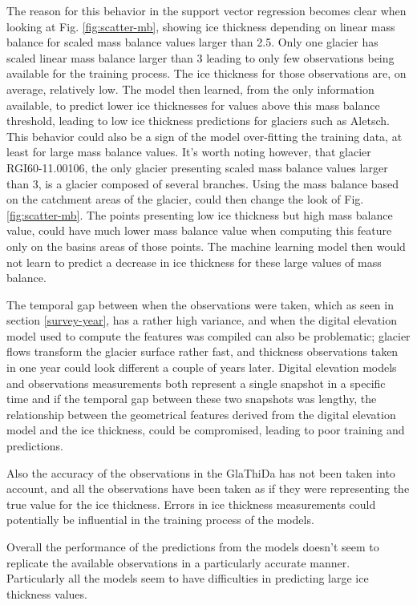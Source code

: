The reason for this behavior in the support vector regression becomes clear when looking at Fig. \ref{fig:scatter-mb}, showing ice thickness depending on linear mass balance for scaled mass balance values larger than 2.5. Only one glacier has scaled linear mass balance larger than 3 leading to only few observations being available for the training process. The ice thickness for those observations are, on average, relatively low. The model then learned, from the only information available, to predict lower ice thicknesses for values above this mass balance threshold, leading to low ice thickness predictions for glaciers such as Aletsch. This behavior could also be a sign of the model over-fitting the training data, at least for large mass balance values. It's worth noting however, that glacier RGI60-11.00106, the only glacier presenting scaled mass balance values larger than 3, is a glacier composed of several branches. Using the mass balance based on the catchment areas of the glacier, could then change the look of Fig. \ref{fig:scatter-mb}. The points presenting low ice thickness but high mass balance value, could have much lower mass balance value when computing this feature only on the basins areas of those points. The machine learning model then would not learn to predict a decrease in ice thickness for these large values of mass balance. 

The temporal gap between when the observations were taken, which as seen in section \ref{survey-year}, has a rather high variance, and when the digital elevation model used to compute the features was compiled can also be problematic; glacier flows transform the glacier surface rather fast, and thickness observations taken in one year could look different a couple of years later. Digital elevation models and observations measurements both represent a single snapshot in a specific time and if the temporal gap between these two snapshots was lengthy, the relationship between the geometrical features derived from the digital elevation model and the ice thickness, could be compromised, leading to poor training and predictions.

Also the accuracy of the observations in the GlaThiDa has not been taken into account, and all the observations have been taken as if they were representing the true value for the ice thickness. Errors in ice thickness measurements could potentially be influential in the training process of the models.

Overall the performance of the predictions from the models doesn't seem to replicate the available observations in a particularly accurate manner. Particularly all the models seem to have difficulties in predicting large ice thickness values.

